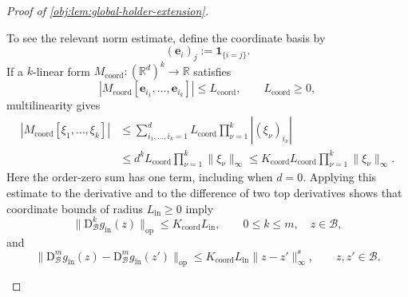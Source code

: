 \documentclass[11pt]{article}
\begin{document}
\begin{proof}[Proof of \cref{obj:lem:global-holder-extension}]
\begin{enumerate}
To see the relevant norm estimate, define the coordinate basis by
\[
(\mathbf e_i)_j:=\mathbf 1_{\{i=j\}}.
\]
If a \(k\)-linear form \(M_{\mathrm{coord}}:(\mathbb R^d)^k\to\mathbb R\) satisfies
\[
|M_{\mathrm{coord}}[\mathbf e_{i_1},\ldots,\mathbf e_{i_k}]|
\le L_{\mathrm{coord}},
\qquad L_{\mathrm{coord}}\ge0,
\]
multilinearity gives
\[
\begin{aligned}
|M_{\mathrm{coord}}[\xi_1,\ldots,\xi_k]|
&\le
\sum_{i_1,\ldots,i_k=1}^d
L_{\mathrm{coord}}\prod_{\nu=1}^k|(\xi_\nu)_{i_\nu}|\\
&\le d^kL_{\mathrm{coord}}
\prod_{\nu=1}^k\|\xi_\nu\|_\infty
\le K_{\mathrm{coord}}L_{\mathrm{coord}}
\prod_{\nu=1}^k\|\xi_\nu\|_\infty.
\end{aligned}
\]
Here the order-zero sum has one term, including when \(d=0\). Applying this estimate to the derivative and to the difference of two top derivatives shows that coordinate bounds of radius \(L_{\mathrm{in}}\ge0\) imply
\[
\|\mathrm D_{\mathcal B}^{k}g_{\mathrm{in}}(z)\|_{\mathrm{op}}
\le K_{\mathrm{coord}}L_{\mathrm{in}},
\qquad 0\le k\le m,\quad z\in\mathcal B,
\]
and
\[
\|\mathrm D_{\mathcal B}^{m}g_{\mathrm{in}}(z)
-\mathrm D_{\mathcal B}^{m}g_{\mathrm{in}}(z')\|_{\mathrm{op}}
\le K_{\mathrm{coord}}L_{\mathrm{in}}\|z-z'\|_\infty^s,
\qquad z,z'\in\mathcal B.
\]


\end{enumerate}
\end{proof}
\end{document}
